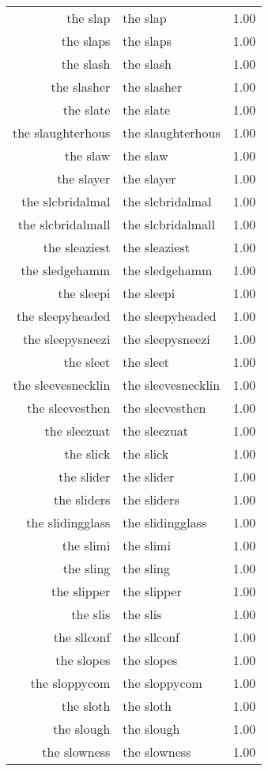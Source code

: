 \begin{table}[ht]
\begin{tabular}{rlr}
  the slap & the slap & 1.00 \\ 
  the slaps & the slaps & 1.00 \\ 
  the slash & the slash & 1.00 \\ 
  the slasher & the slasher & 1.00 \\ 
  the slate & the slate & 1.00 \\ 
  the slaughterhous & the slaughterhous & 1.00 \\ 
  the slaw & the slaw & 1.00 \\ 
  the slayer & the slayer & 1.00 \\ 
  the slcbridalmal & the slcbridalmal & 1.00 \\ 
  the slcbridalmall & the slcbridalmall & 1.00 \\ 
  the sleaziest & the sleaziest & 1.00 \\ 
  the sledgehamm & the sledgehamm & 1.00 \\ 
  the sleepi & the sleepi & 1.00 \\ 
  the sleepyheaded & the sleepyheaded & 1.00 \\ 
  the sleepysneezi & the sleepysneezi & 1.00 \\ 
  the sleet & the sleet & 1.00 \\ 
  the sleevesnecklin & the sleevesnecklin & 1.00 \\ 
  the sleevesthen & the sleevesthen & 1.00 \\ 
  the sleezuat & the sleezuat & 1.00 \\ 
  the slick & the slick & 1.00 \\ 
  the slider & the slider & 1.00 \\ 
  the sliders & the sliders & 1.00 \\ 
  the slidingglass & the slidingglass & 1.00 \\ 
  the slimi & the slimi & 1.00 \\ 
  the sling & the sling & 1.00 \\ 
  the slipper & the slipper & 1.00 \\ 
  the slis & the slis & 1.00 \\ 
  the sllconf & the sllconf & 1.00 \\ 
  the slopes & the slopes & 1.00 \\ 
  the sloppycom & the sloppycom & 1.00 \\ 
  the sloth & the sloth & 1.00 \\ 
  the slough & the slough & 1.00 \\ 
  the slowness & the slowness & 1.00 \\ 

\end{tabular}
\end{table}
